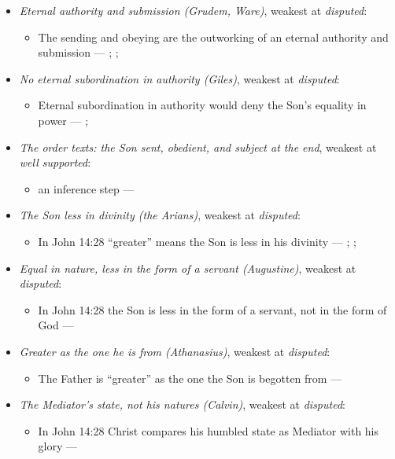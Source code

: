 \documentclass[11pt,paper=\testimonypaper,DIV=13,parskip=false]{scrartcl}
\begin{document}
\begin{itemize}
\item \emph{Eternal authority and submission (Grudem, Ware)}, weakest at \emph{disputed}:
\begin{itemize}
\item The sending and obeying are the outworking of an eternal authority and submission --- \cite[40]{grudem-doctrinal-deviations-2015}; \cite{grudem-ets-trinity-2016}; \cite{ware-father-son-holy-spirit-2005}
\end{itemize}
\item \emph{No eternal subordination in authority (Giles)}, weakest at \emph{disputed}:
\begin{itemize}
\item Eternal subordination in authority would deny the Son’s equality in power --- \cite[323]{giles-ets-trinity-2008}; \cite{giles-jesus-and-the-father-2006}
\end{itemize}
\item \emph{The order texts: the Son sent, obedient, and subject at the end}, weakest at \emph{well supported}:
\begin{itemize}
\item an inference step --- \cite[3, The Triune God]{kibbey-living-systematic-theology-2026}
\end{itemize}
\item \emph{The Son less in divinity (the Arians)}, weakest at \emph{disputed}:
\begin{itemize}
\item In John 14:28 “greater” means the Son is less in his divinity --- \cite[De Synodis 28]{schaff-nicene-post-nicene-fathers-2-4-1892}; \cite[On the Trinity I.7.14]{schaff-nicene-post-nicene-fathers-1-3-1887}; \cite[102]{calvin-commentary-john-2-1847}
\end{itemize}
\item \emph{Equal in nature, less in the form of a servant (Augustine)}, weakest at \emph{disputed}:
\begin{itemize}
\item In John 14:28 the Son is less in the form of a servant, not in the form of God --- \cite[On the Trinity I.7.14]{schaff-nicene-post-nicene-fathers-1-3-1887}
\end{itemize}
\item \emph{Greater as the one he is from (Athanasius)}, weakest at \emph{disputed}:
\begin{itemize}
\item The Father is “greater” as the one the Son is begotten from --- \cite[Against the Arians I.13.58]{schaff-nicene-post-nicene-fathers-2-4-1892}
\end{itemize}
\item \emph{The Mediator’s state, not his natures (Calvin)}, weakest at \emph{disputed}:
\begin{itemize}
\item In John 14:28 Christ compares his humbled state as Mediator with his glory --- \cite[102--103]{calvin-commentary-john-2-1847}
\end{itemize}
\end{itemize}
\end{document}
